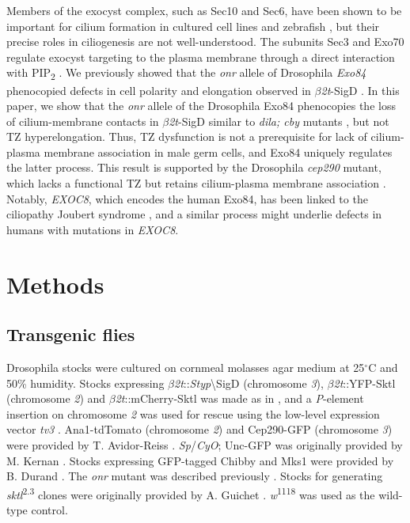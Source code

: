 \documentclass[12pt, twoside, letterpaper]{article}
\newcommand{\PIP}{PIP\textsubscript{2}}
\newcommand{\sigd}{$\beta$\textit{2t}-SigD}
\begin{document}
\begin{doublespacing}
\begin{linenumbers}
    Members of the exocyst complex, such as Sec10 and Sec6, have been shown
    to be important for cilium formation in cultured cell lines and zebrafish
    \citep{zuo2009exocyst, lobo2017exocyst, seixas2016arl13b},
    but their precise roles in ciliogenesis are not well-understood.
    The subunits Sec3 and Exo70 regulate exocyst targeting to the plasma
    membrane through a direct interaction with \PIP{}
    \citep{he2007exo70, zhang2008membrane}.
    We previously showed that
    the \textit{onr} allele of Drosophila \textit{Exo84} phenocopied
    defects in cell polarity and elongation observed in \sigd{}
    \citep{fabian2010phosphatidylinositol}.
    In this paper, we show that the \textit{onr} allele of the Drosophila Exo84
    phenocopies the loss of cilium-membrane contacts in \sigd{} similar to
    \textit{dila; cby} mutants \citep{vieillard2016transition},
    but not TZ hyperelongation.
    Thus, TZ dysfunction is not a prerequisite for lack of
    cilium-plasma membrane association in male germ cells,
    and Exo84 uniquely regulates the latter process.
    This result is supported by the Drosophila \textit{cep290} mutant,
    which lacks a functional TZ but retains cilium-plasma membrane
    association \cite{basiri2014migrating}.
    Notably, \textit{EXOC8}, which encodes the human Exo84, has
    been linked to the ciliopathy Joubert syndrome
    \citep{dixon2012exome},
    and a similar process might underlie defects in humans with
    mutations in \textit{EXOC8}.

    \section{Methods}
    \subsection{Transgenic flies}
    Drosophila stocks were cultured on cornmeal molasses agar medium at 25$^{\circ}$C
    and 50\% humidity.
    Stocks expressing $\beta$\textit{2t}::\textit{Styp}\textbackslash{SigD} (chromosome \textit{3}),
    $\beta$\textit{2t}::YFP-Sktl (chromosome \textit{2}) and
    $\beta$\textit{2t}::mCherry-Sktl was made as in \citep{wei2008depletion},
    and a \textit{P}-element insertion on chromosome \textit{2} was used for rescue using the low-level
    expression vector \textit{tv3} \citep{wong2005pip2}.
    Ana1-tdTomato (chromosome \textit{2}) and Cep290-GFP (chromosome \textit{3}) were provided
    by T. Avidor-Reiss \citep{basiri2014migrating}.
    \textit{Sp}/\textit{CyO}; Unc-GFP was originally provided by M. Kernan \citep{baker2004mechanosensory}.
    Stocks expressing GFP-tagged Chibby and Mks1 were
    provided by B. Durand \citep{enjolras2012drosophila, vieillard2016transition}.
    The \textit{onr} mutant was described previously \citep{giansanti2015exocyst}.
    Stocks for generating \textit{sktl}\textsuperscript{2.3} clones were originally provided by
    A. Guichet \citep{gervais2008pip5k}.
    \textit{w}\textsuperscript{1118} was used as the wild-type control.


\end{linenumbers}
\end{doublespacing}
\end{document}
